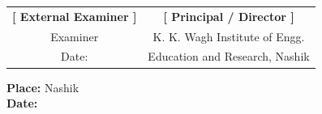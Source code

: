 \vspace{2.5cm}

\noindent
\begin{tabular*}{\textwidth}{@{\extracolsep{\fill}}cc}
    \textbf{[ External Examiner ]} & \textbf{[ Principal / Director ]} \\
    Examiner & K. K. Wagh Institute of Engg. \\
    Date: \underline{\hspace{3cm}} & Education and Research, Nashik \\
\end{tabular*}

\vspace{1.0cm}

\noindent \textbf{Place:} Nashik \\
\textbf{Date:} \underline{\hspace{3cm}}
